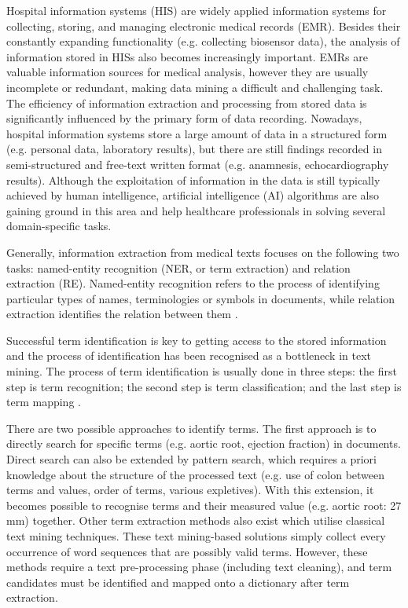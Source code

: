Hospital information systems (HIS) are widely applied information systems for collecting, storing, and managing electronic medical records (EMR). Besides their constantly expanding functionality (e.g. collecting biosensor data), the analysis of information stored in HISs also becomes increasingly important. EMRs are valuable information sources for medical analysis, however they are usually incomplete or redundant, making data mining a difficult and challenging task. The efficiency of information extraction and processing from stored data is significantly influenced by the primary form of data recording. Nowadays, hospital information systems store a large amount of data in a structured form (e.g. personal data, laboratory results), but there are still findings recorded in semi-structured and free-text written format (e.g. anamnesis, echocardiography results). Although the exploitation of information in the data is still typically achieved by human intelligence, artificial intelligence (AI) algorithms are also gaining ground in this area and help healthcare professionals in solving several domain-specific tasks.

Generally, information extraction from medical texts focuses on the following two tasks: named-entity recognition (NER, or term extraction) and relation extraction (RE). Named-entity recognition refers to the process of identifying particular types of names, terminologies or symbols in documents, while relation extraction identifies the relation between them \cite{sun2018data}.

Successful term identification is key to getting access to the stored information and the process of identification has been recognised as a bottleneck in text mining. The process of term identification is usually done in three steps: the first step is term recognition; the second step is term classification; and the last step is term mapping \cite{krauthammer2004term}.

There are two possible approaches to identify terms. The first approach is to directly search for specific terms (e.g. aortic root, ejection fraction) in documents. Direct search can also be extended by pattern search, which requires a priori knowledge about the structure of the processed text (e.g. use of colon between terms and values, order of terms, various expletives). With this extension, it becomes possible to recognise terms and their measured value (e.g. aortic root: 27 mm) together. Other term extraction methods also exist which utilise classical text mining techniques. These text mining-based solutions simply collect every occurrence of word sequences that are possibly valid terms. However, these methods require a text pre-processing phase (including text cleaning), and term candidates must be identified and mapped onto a dictionary after term extraction.


